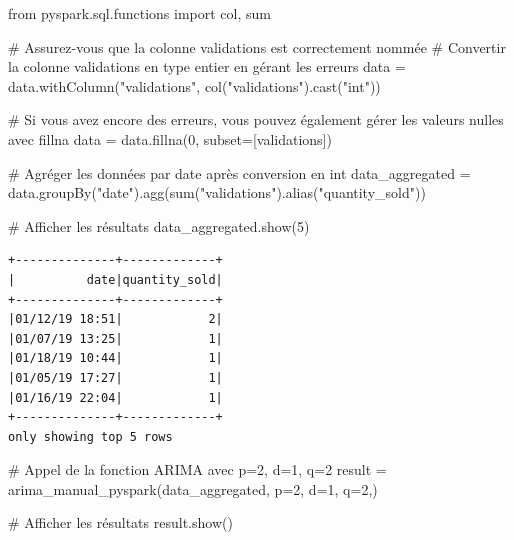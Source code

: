 \documentclass[
  letterpaper,
  DIV=11,
  numbers=noendperiod]{scrartcl}
\newenvironment{Shaded}{\begin{snugshade}}{\end{snugshade}}
\newcommand{\BuiltInTok}[1]{\textcolor[rgb]{0.00,0.23,0.31}{#1}}
\newcommand{\CommentTok}[1]{\textcolor[rgb]{0.37,0.37,0.37}{#1}}
\newcommand{\DecValTok}[1]{\textcolor[rgb]{0.68,0.00,0.00}{#1}}
\newcommand{\ImportTok}[1]{\textcolor[rgb]{0.00,0.46,0.62}{#1}}
\newcommand{\NormalTok}[1]{\textcolor[rgb]{0.00,0.23,0.31}{#1}}
\newcommand{\OperatorTok}[1]{\textcolor[rgb]{0.37,0.37,0.37}{#1}}
\newcommand{\StringTok}[1]{\textcolor[rgb]{0.13,0.47,0.30}{#1}}
\begin{document}
\begin{Shaded}
\begin{Highlighting}[]
\ImportTok{from}\NormalTok{ pyspark.sql.functions }\ImportTok{import}\NormalTok{ col, }\BuiltInTok{sum}

\CommentTok{\# Assurez{-}vous que la colonne \textquotesingle{}validations\textquotesingle{} est correctement nommée}
\CommentTok{\# Convertir la colonne \textquotesingle{}validations\textquotesingle{} en type entier en gérant les erreurs}
\NormalTok{data }\OperatorTok{=}\NormalTok{ data.withColumn(}\StringTok{"validations"}\NormalTok{, col(}\StringTok{"validations"}\NormalTok{).cast(}\StringTok{"int"}\NormalTok{))}

\CommentTok{\# Si vous avez encore des erreurs, vous pouvez également gérer les valeurs nulles avec fillna}
\NormalTok{data }\OperatorTok{=}\NormalTok{ data.fillna(}\DecValTok{0}\NormalTok{, subset}\OperatorTok{=}\NormalTok{[}\StringTok{\textquotesingle{}validations\textquotesingle{}}\NormalTok{])}

\CommentTok{\# Agréger les données par date après conversion en int}
\NormalTok{data\_aggregated }\OperatorTok{=}\NormalTok{ data.groupBy(}\StringTok{"date"}\NormalTok{).agg(}\BuiltInTok{sum}\NormalTok{(}\StringTok{"validations"}\NormalTok{).alias(}\StringTok{"quantity\_sold"}\NormalTok{))}

\CommentTok{\# Afficher les résultats}
\NormalTok{data\_aggregated.show(}\DecValTok{5}\NormalTok{)}
\end{Highlighting}
\end{Shaded}

\begin{verbatim}
+--------------+-------------+
|          date|quantity_sold|
+--------------+-------------+
|01/12/19 18:51|            2|
|01/07/19 13:25|            1|
|01/18/19 10:44|            1|
|01/05/19 17:27|            1|
|01/16/19 22:04|            1|
+--------------+-------------+
only showing top 5 rows
\end{verbatim}

\begin{Shaded}
\begin{Highlighting}[]


\CommentTok{\# Appel de la fonction ARIMA avec p=2, d=1, q=2}
\NormalTok{result }\OperatorTok{=}\NormalTok{ arima\_manual\_pyspark(data\_aggregated, p}\OperatorTok{=}\DecValTok{2}\NormalTok{, d}\OperatorTok{=}\DecValTok{1}\NormalTok{, q}\OperatorTok{=}\DecValTok{2}\NormalTok{,)}

\CommentTok{\# Afficher les résultats}
\NormalTok{result.show()}
\end{Highlighting}
\end{Shaded}
\end{document}
